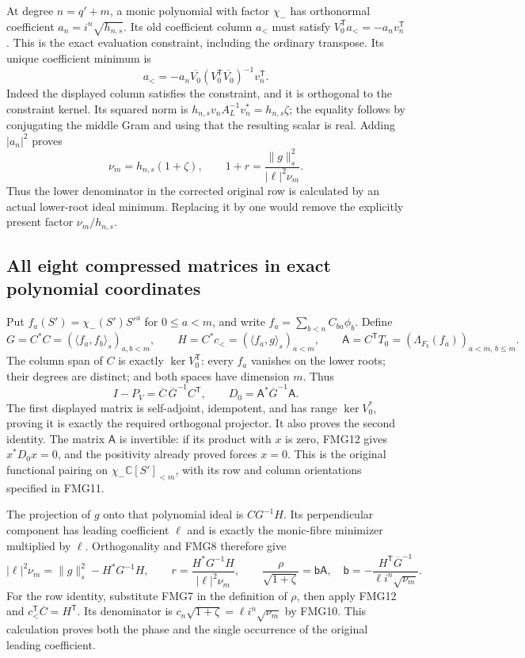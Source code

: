 \documentclass[11pt,a4paper]{article}
\begin{document}
At degree $n=q'+m$, a monic polynomial with factor $\chi_-$ has
orthonormal coefficient $a_n=i^n\sqrt{h_{n,s}}$. Its old coefficient
column $a_<$ must satisfy
$V_0^{\mathsf T}a_<=-a_nv_n^{\mathsf T}$. This is the exact
evaluation constraint, including the ordinary transpose.
Its unique coefficient minimum is
\[
 a_<=-a_n\overline{V_0}
        (V_0^{\mathsf T}\overline{V_0})^{-1}v_n^{\mathsf T}.
                                                               \tag{FMG9}
\]
Indeed the displayed column satisfies the constraint, and it is
orthogonal to the constraint kernel. Its squared norm is
$h_{n,s}v_nA_L^{-1}v_n^*=h_{n,s}\zeta$; the equality follows
by conjugating the middle Gram and using that the resulting scalar
is real. Adding $|a_n|^2$ proves
\[
 \boxed{\quad \nu_m=h_{n,s}(1+\zeta),\qquad
       1+r=\frac{\|g\|_s^2}{|\ell|^2\nu_m}.\quad}       \tag{FMG10}
\]
Thus the lower denominator in the corrected original row is
calculated by an actual lower-root ideal minimum. Replacing it by
one would remove the explicitly present factor $\nu_m/h_{n,s}$.

\subsection{All eight compressed matrices in exact polynomial coordinates}
Put $f_a(S')=\chi_-(S')S'^a$ for $0\le a<m$, and write
$f_a=\sum_{b<n}C_{ba}\phi_b$. Define
\[
 G=C^*C=(\langle f_a,f_b\rangle_s)_{a,b<m},\qquad
 H=C^*c_<=(\langle f_a,g\rangle_s)_{a<m},\qquad
 \mathsf A=C^{\mathsf T}T_0
       =(\Lambda_{F_b}(f_a))_{a<m,\,b\le m}.
                                                               \tag{FMG11}
\]
The column span of $C$ is exactly $\ker V_0^{\mathsf T}$:
every $f_a$ vanishes on the lower roots; their degrees are distinct;
and both spaces have dimension $m$. Thus
\[
 I-P_V=\overline C\,\overline G^{-1}C^{\mathsf T},\qquad
 D_0=\mathsf A^*\overline G^{-1}\mathsf A .                \tag{FMG12}
\]
The first displayed matrix is self-adjoint, idempotent, and has
range $\ker V_0^*$, proving it is exactly the required orthogonal
projector. It also proves the second identity. The matrix
$\mathsf A$ is invertible: if its product with $x$ is zero,
FMG12 gives $x^*D_0x=0$, and the positivity already proved forces
$x=0$. This is the original functional pairing on
$\chi_-\mathbb C[S']_{<m}$, with its row and column orientations
specified in FMG11.

The projection of $g$ onto that polynomial ideal is $CG^{-1}H$.
Its perpendicular component has leading coefficient $\ell$ and
is exactly the monic-fibre minimizer multiplied by $\ell$.
Orthogonality and FMG8 therefore give
\[
 |\ell|^2\nu_m=\|g\|_s^2-H^*G^{-1}H,\qquad
 r=\frac{H^*G^{-1}H}{|\ell|^2\nu_m},\qquad
 \frac{\rho}{\sqrt{1+\zeta}}=\mathsf b\mathsf A,
 \quad \mathsf b=-\frac{H^{\mathsf T}\overline G^{-1}}
                            {\ell i^n\sqrt{\nu_m}}.
                                                               \tag{FMG13}
\]
For the row identity, substitute FMG7 in the definition of $\rho$,
then apply FMG12 and $c_<^{\mathsf T}\overline C=H^{\mathsf T}$.
Its denominator is
$c_n\sqrt{1+\zeta}=\ell i^n\sqrt{\nu_m}$ by FMG10.
This calculation proves both the phase and the single occurrence
of the original leading coefficient.
\end{document}
